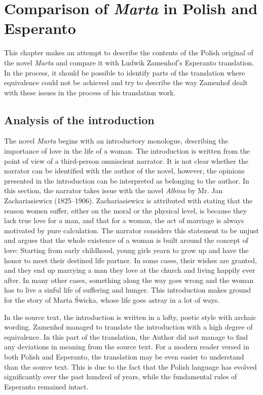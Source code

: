\chapter{Comparison of \textit{Marta} in Polish and Esperanto}

This chapter makes an attempt to describe the contents of the Polish original of the novel \textit{Marta} and compare it with Ludwik Zamenhof's Esperanto translation.
In the process, it should be possible to identify parts of the translation where equivalence could not be achieved and try to describe the way Zamenhof dealt with these issues in the process of his translation work.

\section{Analysis of the introduction}

The novel \textit{Marta} begins with an introductory monologue, describing the importance of love in the life of a woman.
The introduction is written from the point of view of a third-person omniscient narrator.
It is not clear whether the narrator can be identified with the author of the novel, however, the opinions presented in the introduction can be interpreted as belonging to the author.
In this section, the narrator takes issue with the novel \textit{Albina} by Mr. Jan Zachariasiewicz (1825--1906).
Zachariasiewicz is attributed with stating that the reason women suffer, either on the moral or the physical level, is because they lack true love for a man, and that for a woman, the act of marriage is always motivated by pure calculation.
The narrator considers this statement to be unjust and argues that the whole existence of a woman is built around the concept of love:
Starting from early childhood, young girls yearn to grow up and have the honor to meet their destined life partner.
In some cases, their wishes are granted, and they end up marrying a man they love at the church and living happily ever after.
In many other cases, something along the way goes wrong and the woman has to live a sinful life of suffering and hunger.
This introduction makes ground for the story of Marta Świcka, whose life goes astray in a lot of ways.

In the source text, the introduction is written in a lofty, poetic style with archaic wording.
Zamenhof managed to translate the introduction with a high degree of equivalence.
In this part of the translation, the Author did not manage to find any deviations in meaning from the source text.
For a modern reader versed in both Polish and Esperanto, the translation may be even easier to understand than the source text.
This is due to the fact that the Polish language has evolved significantly over the past hundred of years, while the fundamental rules of Esperanto remained intact.

